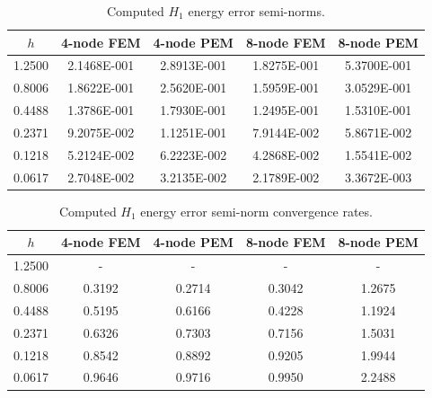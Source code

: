 \documentclass[12pt]{article}
\begin{document}
\begin{table}[!ht]
  \begin{center}
    \begin{tabular}{| c | c | c | c | c |}
    \hline
    $h$ & 4-node FEM & 4-node PEM & 8-node FEM & 8-node PEM \\ \hline
    1.2500 & 2.1468E-001 & 2.8913E-001 & 1.8275E-001 & 5.3700E-001 \\ \hline
    0.8006 & 1.8622E-001 & 2.5620E-001 & 1.5959E-001 & 3.0529E-001 \\ \hline
    0.4488 & 1.3786E-001 & 1.7930E-001 & 1.2495E-001 & 1.5310E-001 \\ \hline
    0.2371 & 9.2075E-002 & 1.1251E-001 & 7.9144E-002 & 5.8671E-002 \\ \hline
    0.1218 & 5.2124E-002 & 6.2223E-002 & 4.2868E-002 & 1.5541E-002 \\ \hline
    0.0617 & 2.7048E-002 & 3.2135E-002 & 2.1789E-002 & 3.3672E-003 \\
    \hline
    \end{tabular}
    \caption{Computed $H_1$ energy error semi-norms.}
    \vspace{-5pt}
    \label{tab:h1_error}
    \vspace{-25pt}
  \end{center}
\end{table}
\begin{table}[!ht]
  \begin{center}
    \begin{tabular}{| c | c | c | c | c |}
    \hline
    $h$ & 4-node FEM & 4-node PEM & 8-node FEM & 8-node PEM \\ \hline
    1.2500 &	-	&	-	&	-	&       -      \\ \hline
    0.8006 &	0.3192	&	0.2714	&	0.3042	&	1.2675 \\ \hline
    0.4488 &	0.5195	&	0.6166	&	0.4228	&	1.1924 \\ \hline
    0.2371 &	0.6326	&	0.7303	&	0.7156	&	1.5031 \\ \hline
    0.1218 &	0.8542	&	0.8892	&	0.9205	&	1.9944 \\ \hline
    0.0617 &	0.9646	&	0.9716	&	0.9950	&	2.2488 \\
    \hline
    \end{tabular}
    \caption{Computed $H_1$ energy error semi-norm convergence rates.}
    \vspace{-5pt}
    \label{tab:h1_rates}
    \vspace{-25pt}
  \end{center}
\end{table}
\end{document}
